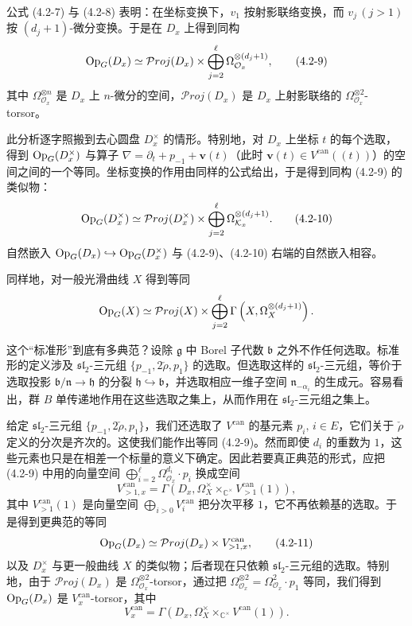 公式 (4.2-7) 与 (4.2-8) 表明：在坐标变换下，$v_1$ 按射影联络变换，而 $v_j\,(j>1)$ 按 $(d_j+1)$-微分变换。于是在 $D_x$ 上得到同构
\begin{equation}
    \operatorname{Op}_G(D_x)\simeq\mathcal{P}roj(D_x)\times\bigoplus_{j=2}^{\ell}\Omega_{\mathcal{O}_x}^{\otimes(d_j+1)},
    \tag{4.2-9}
\end{equation}
其中 $\Omega_{\mathcal{O}_x}^{\otimes n}$ 是 $D_x$ 上 $n$-微分的空间，$\mathcal{P}roj(D_x)$ 是 $D_x$ 上射影联络的 $\Omega_{\mathcal{O}_x}^{\otimes2}$-torsor。

此分析逐字照搬到去心圆盘 $D_x^\times$ 的情形。特别地，对 $D_x$ 上坐标 $t$ 的每个选取，得到 $\operatorname{Op}_G(D_x^\times)$ 与算子 $\nabla=\partial_t+p_{-1}+\mathbf{v}(t)$（此时 $\mathbf{v}(t)\in V^{\mathrm{can}}((t))$）的空间之间的一个等同。坐标变换的作用由同样的公式给出，于是得到同构 (4.2-9) 的类似物：
\begin{equation}
    \operatorname{Op}_G(D_x^\times)\simeq\mathcal{P}roj(D_x^\times)\times\bigoplus_{j=2}^{\ell}\Omega_{\mathcal{K}_x}^{\otimes(d_j+1)}.
    \tag{4.2-10}
\end{equation}
自然嵌入 $\operatorname{Op}_G(D_x)\hookrightarrow\operatorname{Op}_G(D_x^\times)$ 与 (4.2-9)、(4.2-10) 右端的自然嵌入相容。

同样地，对一般光滑曲线 $X$ 得到等同
\[
    \operatorname{Op}_G(X)\simeq\mathcal{P}roj(X)\times\bigoplus_{j=2}^{\ell}\Gamma\left(X,\Omega_X^{\otimes(d_j+1)}\right).
\]

这个“标准形”到底有多典范？设除 $\mathfrak{g}$ 中 Borel 子代数 $\mathfrak{b}$ 之外不作任何选取。标准形的定义涉及 $\mathfrak{sl}_2$-三元组 $\{p_{-1},2\check{\rho},p_1\}$ 的选取。但选取这样的 $\mathfrak{sl}_2$-三元组，等价于选取投影 $\mathfrak{b}/\mathfrak{n}\to\mathfrak{h}$ 的分裂 $\mathfrak{h}\hookrightarrow\mathfrak{b}$，并选取相应一维子空间 $\mathfrak{n}_{-\alpha_i}$ 的生成元。容易看出，群 $B$ 单传递地作用在这些选取之集上，从而作用在 $\mathfrak{sl}_2$-三元组之集上。

给定 $\mathfrak{sl}_2$-三元组 $\{p_{-1},2\check{\rho},p_1\}$，我们还选取了 $V^{\mathrm{can}}$ 的基元素 $p_i,\,i\in E$，它们关于 $\check{\rho}$ 定义的分次是齐次的。这使我们能作出等同 (4.2-9)。然而即使 $d_i$ 的重数为 $1$，这些元素也只是在相差一个标量的意义下确定。因此若要真正典范的形式，应把 (4.2-9) 中用的向量空间 $\bigoplus_{i=2}^{\ell}\Omega_{\mathcal{O}_x}^{d_i}\cdot p_i$ 换成空间
\[
    V_{>1,x}^{\mathrm{can}}=\Gamma\left(D_x,\Omega_X^\times\times_{\mathbb{C}^\times}V_{>1}^{\mathrm{can}}(1)\right),
\]
其中 $V_{>1}^{\mathrm{can}}(1)$ 是向量空间 $\bigoplus_{i>0}V_i^{\mathrm{can}}$ 把分次平移 $1$，它不再依赖基的选取。于是得到更典范的等同
\begin{equation}
    \operatorname{Op}_G(D_x)\simeq\mathcal{P}roj(D_x)\times V_{>1,x}^{\mathrm{can}},
    \tag{4.2-11}
\end{equation}
以及 $D_x^\times$ 与更一般曲线 $X$ 的类似物；后者现在只依赖 $\mathfrak{sl}_2$-三元组的选取。特别地，由于 $\mathcal{P}roj(D_x)$ 是 $\Omega_{\mathcal{O}_x}^{\otimes2}$-torsor，通过把 $\Omega_{\mathcal{O}_x}^{\otimes2}=\Omega_{\mathcal{O}_x}^2\cdot p_1$ 等同，我们得到 $\operatorname{Op}_G(D_x)$ 是 $V_x^{\mathrm{can}}$-torsor，其中
\[
    V_x^{\mathrm{can}}=\Gamma\left(D_x,\Omega_X^\times\times_{\mathbb{C}^\times}V^{\mathrm{can}}(1)\right).
\]

